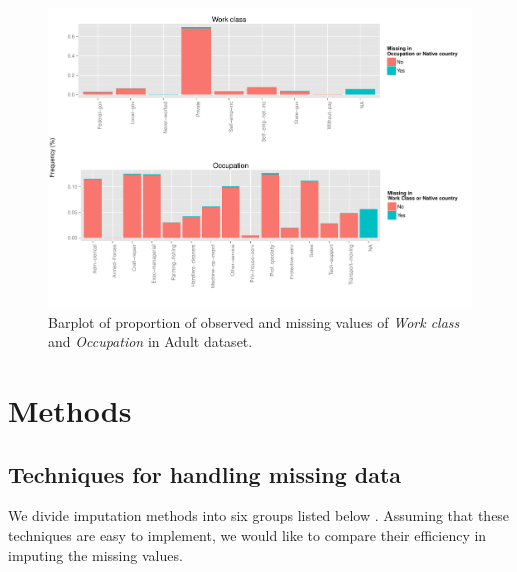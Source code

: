 \documentclass[12pt]{article}
\begin{document}
\begin{figure}[htbp] 
   \centering
   \includegraphics[scale=.6]{barplot-missing.pdf} 
   \caption{Barplot of proportion of observed and missing values of \textit{Work class} and \textit{Occupation} in Adult dataset.}
   \label{barplot-missing}
\end{figure}

\pagebreak
\section{Methods}


\subsection{Techniques for handling missing data}
We divide imputation methods into six groups listed
below \citep{batista2003analysis}. Assuming that these techniques are easy to
implement, we would like to compare their efficiency in imputing the missing
values.
\end{document}
